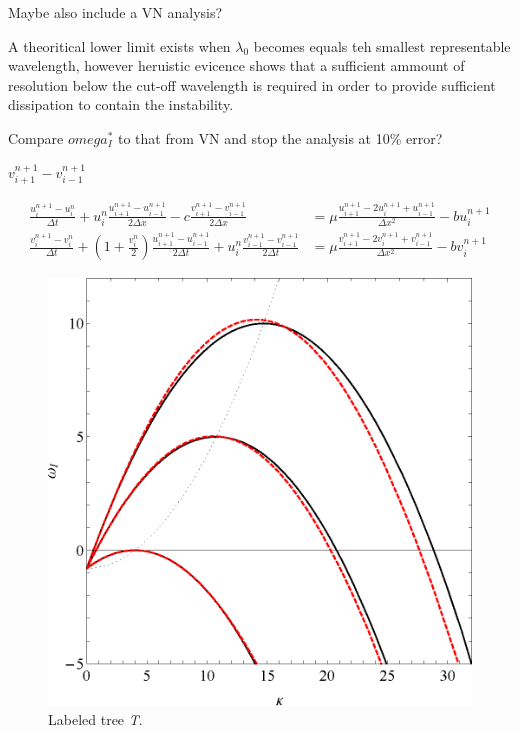 \documentclass{ws-ijbc}
\newcommand\beqa{\begin{equation}\begin{aligned}}
\newcommand\eeqa{\end{aligned}\end{equation}}
\begin{document}
Maybe also include a VN analysis? 


A theoritical lower limit exists when $\lambda_0$ becomes equals teh smallest representable wavelength, however heruistic evicence shows that a sufficient ammount of resolution below the cut-off wavelength is required in order to provide sufficient dissipation to contain the instability. 

Compare $omega_I^*$ to that from VN and stop the analysis at 10\% error? 

$v^{n+1}_{i+1} - v^{n+1}_{i-1}$

\beqa
\frac{u^{n+1}_i - u^n_i}{\Delta t} + u^n_i \frac{u^{n+1}_{i+1} - u^{n+1}_{i-1}}{2 \Delta x} - c \frac{v^{n+1}_{i+1} - v^{n+1}_{i-1}}{2 \Delta x} &= \mu \frac{u^{n+1}_{i+1} - 2 u^{n+1}_i + u^{n+1}_{i-1}}{\Delta x^2} - b u^{n+1}_i  \\
\frac{v^{n+1}_i - v^n_i}{\Delta t} + \left(1 + \frac{v^n_i}{2}\right) \frac{u^{n+1}_{i+1} - u^{n+1}_{i-1}}{2 \Delta t} + u^n_i \frac{v^{n+1}_{i-1} - v^{n+1}_{i-1}}{2 \Delta t} &= \mu \frac{v^{n+1}_{i+1} - 2 v^{n+1}_i + v^{n+1}_{i-1}}{\Delta x^2} - b v^{n+1}_i 
\label{eq.ky.num}
\eeqa






\begin{figure}[htbp]
\begin{center}
\includegraphics[width=0.5\linewidth]{kvomega.eps}
\end{center}
\caption{Labeled tree {\it T}.}
\label{figxyz}
\end{figure}
\end{document}
